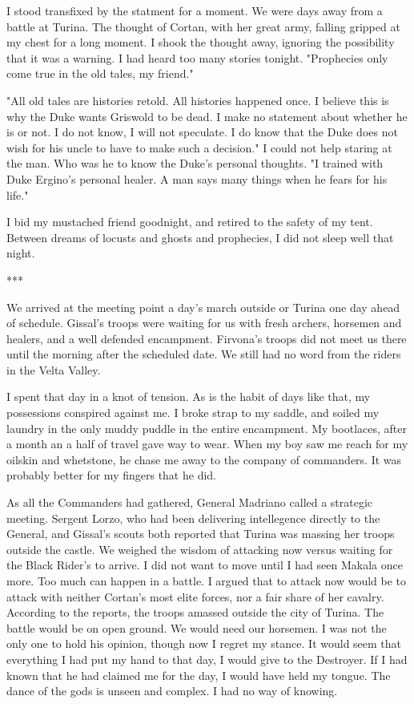 \documentclass{article}
\begin{document}
I stood transfixed by the statment for a moment. We were days away from a battle at Turina. The thought of Cortan, with her great army, falling gripped at my chest for a long moment. I shook the thought away, ignoring the possibility that it was a warning. I had heard too many stories tonight. "Prophecies only come true in the old tales, my friend."

"All old tales are histories retold. All histories happened once. I believe this is why the Duke wants Griswold to be dead. I make no statement about whether he is or not. I do not know, I will not speculate. I do know that the Duke does not wish for his uncle to have to make such a decision." I could not help staring at the man. Who was he to know the Duke's personal thoughts. "I trained with Duke Ergino's personal healer. A man says many things when he fears for his life."

I bid my mustached friend goodnight, and retired to the safety of my tent. Between dreams of locusts and ghosts and prophecies, I did not sleep well that night. 

***

We arrived at the meeting point a day's march outside or Turina one day ahead of schedule. Gissal's troops were waiting for us with fresh archers, horsemen and healers, and a well defended encampment. Firvona's troops did not meet us there until the morning after the scheduled date. We still had no word from the riders in the Velta Valley. 

I spent that day in a knot of tension. As is the habit of days like that, my possessions conspired against me. I broke strap to my saddle, and soiled my laundry in the only muddy puddle in the entire encampment. My bootlaces, after a month an a half of travel gave way to wear. When my boy saw me reach for my oilskin and whetstone, he chase me away to the company of commanders. It was probably better for my fingers that he did.

As all the Commanders had gathered, General Madriano called a strategic meeting. Sergent Lorzo, who had been delivering intellegence directly to the General, and Gissal's scouts both reported that Turina was massing her troops outside the castle. We weighed the wisdom of attacking now versus waiting for the Black Rider's to arrive. I did not want to move until I had seen Makala once more. Too much can happen in a battle. I argued that to attack now would be to attack with neither Cortan's most elite forces, nor a fair share of her cavalry. According to the reports, the troops amassed outside the city of Turina. The battle would be on open ground. We would need our horsemen. I was not the only one to hold his opinion, though now I regret my stance. It would seem that everything I had put my hand to that day, I would give to the Destroyer. If I had known that he had claimed me for the day, I would have held my tongue. The dance of the gods is unseen and complex. I had no way of knowing.
\end{document}
